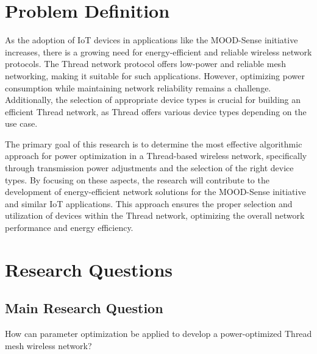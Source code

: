 \section{Problem Definition}\label{sec:problem_definition}
As the adoption of \gls{IoT} devices in applications like the MOOD-Sense initiative increases, there is a growing need for energy-efficient and reliable wireless network protocols. The Thread network protocol offers low-power and reliable mesh networking, making it suitable for such applications. However, optimizing power consumption while maintaining network reliability remains a challenge. Additionally, the selection of appropriate device types is crucial for building an efficient Thread network, as Thread offers various device types depending on the use case.

The primary goal of this research is to determine the most effective algorithmic approach for power optimization in a Thread-based wireless network, specifically through transmission power adjustments and the selection of the right device types. By focusing on these aspects, the research will contribute to the development of energy-efficient network solutions for the MOOD-Sense initiative and similar \gls{IoT} applications. This approach ensures the proper selection and utilization of devices within the Thread network, optimizing the overall network performance and energy efficiency.


\section{Research Questions}\label{sec:research_questions}

\subsection*{Main Research Question}
How can parameter optimization be applied to develop a power-optimized Thread mesh wireless network?


